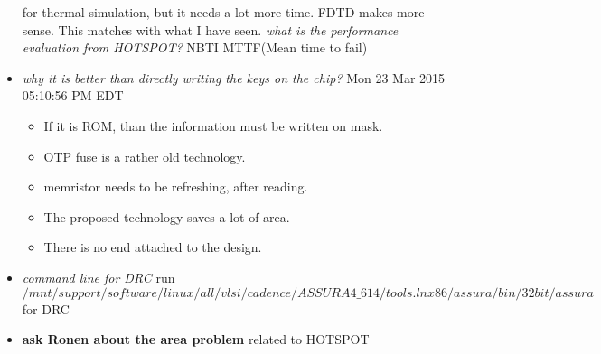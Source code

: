 \documentclass[]{article}
\newcommand{\todo}[1]{{\color{red}\textbf{#1}}}
\newcommand{\solved}[1]{{\color{blue}\textit{#1}}}
\begin{document}
\begin{itemize}
                for thermal simulation, but it needs a lot more time. FDTD makes
                more sense. This matches with what I have seen. \solved{what is
                the performance evaluation from HOTSPOT?} NBTI MTTF(Mean time to
                fail)
                \item \solved{why it is better than directly writing the keys on
                the chip?} Mon 23 Mar 2015 05:10:56 PM EDT 
                    \begin{itemize}
                        \item If it is ROM, than the information must be written on
                        mask.
                        \item OTP fuse is a rather old technology.
                        \item memristor needs to be refreshing, after reading.
                        \item The proposed technology saves a lot of area.
                        \item There is no end attached to the design.
                    \end{itemize}
                \item \solved{command line for DRC} run
                \begin{equation}
                /mnt/support/software/linux/all/vlsi/cadence/ASSURA4\_614/tools.lnx86/assura/bin/32bit/assura
                \end{equation}
                for DRC
                \item \todo{ask Ronen about the area problem} related to HOTSPOT

                
        \end{itemize}
\end{document}
